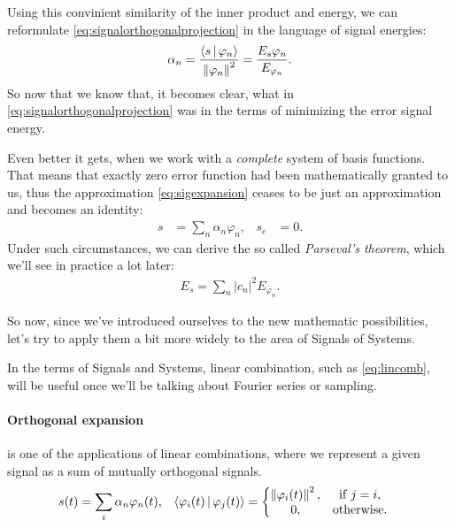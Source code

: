 \documentclass[11pt,a4paper]{report}
\theoremstyle{remark}
\theoremstyle{definition}
\begin{document}
				Using this convinient similarity of the inner product and energy, we can reformulate \eqref{eq:signalorthogonalprojection} in the language of signal energies:
				\begin{align}
					\alpha_n = \frac{\langle s\,|\,\varphi_n\rangle}{\left\lVert\varphi_n\right\rVert^2} = \frac{E_{s}{\varphi_n}}{E_{\varphi_n}}.
				\end{align}
				So now that we know that, it becomes clear, what in \eqref{eq:signalorthogonalprojection} was in the terms of minimizing the error signal energy.
				
				Even better it gets, when we work with a \textit{complete} system of basis functions. That means that exactly zero error function had been mathematically granted to us, thus the approximation \eqref{eq:sigexpansion} ceases to be just an approximation and becomes an identity:
				\begin{align}
					s &= \sum_n \alpha_n \varphi_n,
				&
					s_e &= 0.
				\end{align}
				Under such circumstances, we can derive the so called \textit{Parseval's theorem}, which we'll see in practice a lot later:
				\begin{align}
					E_s = \sum_n |c_n|^2 E_{\varphi_n}.
				\end{align}
				
				So now, since we've introduced ourselves to the new mathematic possibilities, let's try to apply them a bit more widely to the area of Signals of Systems.
				
				In the terms of Signals and Systems, linear combination, such as \eqref{eq:lincomb}, will be useful once we'll be talking about Fourier series or sampling.
				
				\paragraph{Orthogonal expansion} is one of the applications of linear combinations, where we represent a given signal as a sum of mutually orthogonal signals.
				\begin{align}
					\label{def:orthogonalexpansion}
					s(t) &= \sum_{i} \alpha_n \varphi_n(t),
				&
					\langle\varphi_i(t)\,|\,\varphi_j(t)\rangle &=
						\left\{ \begin{matrix}
							\left\lVert\varphi_i(t)\right\rVert^2, & \mathrm{if} \; j = i, \\
							0, & \mathrm{otherwise}.
						\end{matrix} \right.
				\end{align}
				
\end{document}
